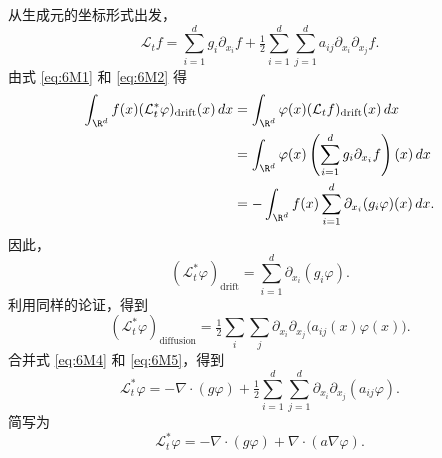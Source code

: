 从生成元的坐标形式出发，
\begin{equation*}
  \mathcal L_t f=\sum_{i=1}^d g_i\partial_{x_i}f+
       \tfrac12\sum_{i=1}^d\sum_{j=1}^d a_{ij}\partial_{x_i}\partial_{x_j}f.
  \tag{6M3}\label{eq:6M3}
\end{equation*}
由式 \eqref{eq:6M1} 和 \eqref{eq:6M2} 得
\[
  \begin{aligned}
   \int_{\R^d} f(x)(\mathcal L_t^*\varphi)_{\mathrm{drift}}(x)\,dx
    &=\int_{\R^d}\varphi(x)(\mathcal L_tf)_{\mathrm{drift}}(x)\,dx\\
    &=\int_{\R^d}\varphi(x)\left(\sum_{i=1}^d g_i\partial_{x_i}f\right)(x)\,dx\\
    &=-\int_{\R^d} f(x)\sum_{i=1}^d\partial_{x_i}(g_i\varphi)(x)\,dx.
  \end{aligned}
\]
因此，
\begin{equation*}
  (\mathcal L_t^*\varphi)_{\mathrm{drift}}=\sum_{i=1}^d\partial_{x_i}(g_i\varphi).
  \tag{6M4}\label{eq:6M4}
\end{equation*}
利用同样的论证，得到
\begin{equation*}
  (\mathcal L_t^*\varphi)_{\mathrm{diffusion}}
   =\tfrac12\sum_i\sum_j\partial_{x_i}\partial_{x_j}\bigl(a_{ij}(x)\varphi(x)\bigr).
  \tag{6M5}\label{eq:6M5}
\end{equation*}
合并式 \eqref{eq:6M4} 和 \eqref{eq:6M5}，得到
\begin{equation*}
  \mathcal L_t^*\varphi=-\nabla\cdot(g\varphi)
   +\tfrac12\sum_{i=1}^d\sum_{j=1}^d\partial_{x_i}\partial_{x_j}(a_{ij}\varphi).
  \tag{6M6}\label{eq:6M6}
\end{equation*}
简写为
\begin{equation*}
  \mathcal L_t^*\varphi=-\nabla\cdot(g\varphi)+\nabla\cdot(a\nabla\varphi).
  \tag{6M7}\label{eq:6M7}
\end{equation*}



